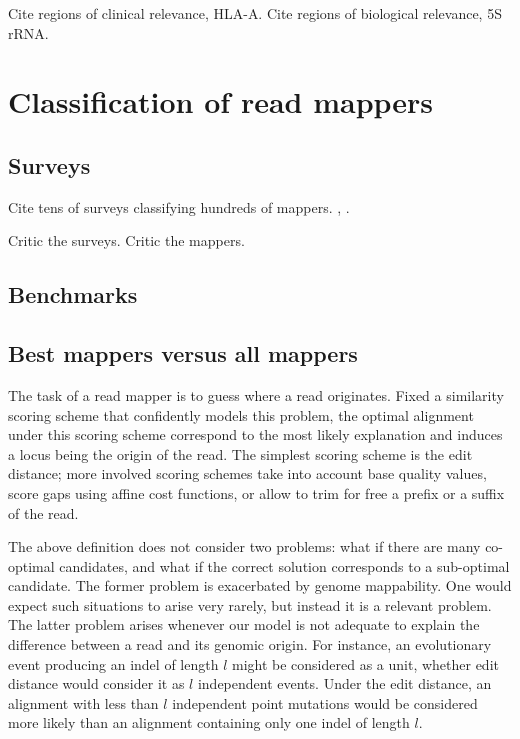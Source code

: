 Cite regions of clinical relevance, \eg HLA-A.
Cite regions of biological relevance, \eg 5S rRNA.


\section{Classification of read mappers}

\subsection{Surveys}

Cite tens of surveys classifying hundreds of mappers.
\citep{Li2010}, \citep{Fonseca2012}.

Critic the surveys.
Critic the mappers.

\subsection{Benchmarks}

\citep{Hatem2013} \citep{Holtgrewe2011}


\subsection{Best mappers versus all mappers}

The task of a read mapper is to guess where a read originates.
Fixed a similarity scoring scheme that confidently models this problem, the optimal alignment under this scoring scheme correspond to the most likely explanation and induces a locus being the origin of the read.
The simplest scoring scheme is the edit distance; more involved scoring schemes take into account base quality values, score gaps using affine cost functions, or allow to trim for free a prefix or a suffix of the read.

The above definition does not consider two problems: what if there are many co-optimal candidates, and what if the correct solution corresponds to a sub-optimal candidate.
The former problem is exacerbated by genome mappability.
One would expect such situations to arise very rarely, but instead it is a relevant problem.
The latter problem arises whenever our model is not adequate to explain the difference between a read and its genomic origin.
For instance, an evolutionary event producing an indel of length $l$ might be considered as a unit, whether edit distance would consider it as $l$ independent events.
Under the edit distance, an alignment with less than $l$ independent point mutations would be considered more likely than an alignment containing only one indel of length $l$.

